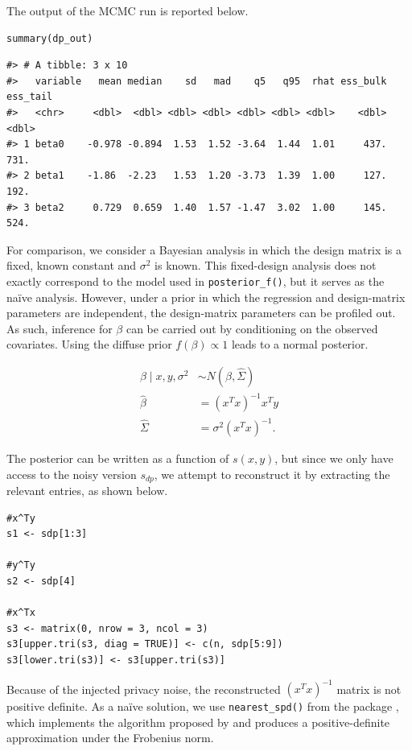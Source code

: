 The output of the MCMC run is reported below.

\begin{verbatim}
summary(dp_out)
\end{verbatim}

\begin{verbatim}
#> # A tibble: 3 x 10
#>   variable   mean median    sd   mad    q5   q95  rhat ess_bulk ess_tail
#>   <chr>     <dbl>  <dbl> <dbl> <dbl> <dbl> <dbl> <dbl>    <dbl>    <dbl>
#> 1 beta0    -0.978 -0.894  1.53  1.52 -3.64  1.44  1.01     437.     731.
#> 2 beta1    -1.86  -2.23   1.53  1.20 -3.73  1.39  1.00     127.     192.
#> 3 beta2     0.729  0.659  1.40  1.57 -1.47  3.02  1.00     145.     524.
\end{verbatim}

For comparison, we consider a Bayesian analysis in which the design matrix
is a fixed, known constant and \(\sigma^2\) is known. This fixed-design analysis
does not exactly correspond to the model used in \texttt{posterior\_f()}, but it serves
as the naïve analysis. However, under a prior in which the regression and
design-matrix parameters are independent, the design-matrix parameters can be
profiled out. As such, inference
for \(\beta\) can be carried out by conditioning on the observed covariates.
Using the diffuse prior \(f(\beta) \propto 1\) leads to a normal posterior.

\begin{equation*}
\begin{aligned}
\beta \mid x,y, \sigma^2 &\sim N(\hat{\beta}, \hat{\Sigma})\\
\hat{\beta} &= (x^Tx)^{-1}x^Ty\\
\hat{\Sigma} &= \sigma^{2}(x^Tx)^{-1}.
\end{aligned}
\end{equation*}

The posterior can be written as a function of \(s(x,y)\), but since
we only have access to the noisy version \(s_{dp}\), we
attempt to reconstruct it by extracting the
relevant entries, as shown below.

\begin{verbatim}
#x^Ty
s1 <- sdp[1:3]

#y^Ty
s2 <- sdp[4]

#x^Tx
s3 <- matrix(0, nrow = 3, ncol = 3)
s3[upper.tri(s3, diag = TRUE)] <- c(n, sdp[5:9])
s3[lower.tri(s3)] <- s3[upper.tri(s3)]
\end{verbatim}

Because of the injected privacy noise, the reconstructed
\((x^Tx)^{-1}\) matrix is not positive definite. As a naïve solution, we use
\texttt{nearest\_spd()} from the  package \citep{pracma_pkg}, which implements
the algorithm proposed by \citet{Higham1988} and produces a positive-definite
approximation under the Frobenius norm.

